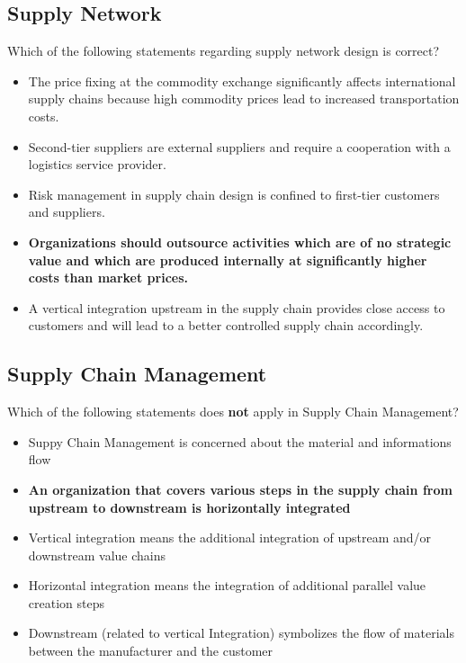 \subsection{Supply Network }
Which of the following statements regarding supply network design is correct?
\begin{itemize}
	\item The price fixing at the commodity exchange significantly affects international supply chains because high commodity prices lead to increased transportation costs. 
	\item Second-tier suppliers are external suppliers and require a cooperation with a logistics service provider. 
	\item  Risk management in supply chain design is confined to first-tier customers and suppliers. 
	\item \textbf{Organizations should outsource activities which are of no strategic value and which are produced internally at significantly higher costs than market prices.  }
	\item  A vertical integration upstream in the supply chain provides close access to customers and will lead to a better controlled supply chain accordingly. 
\end{itemize}

\subsection{Supply Chain Management}
Which of the following statements does \textbf{not} apply in Supply Chain Management?
\begin{itemize}
\item Suppy Chain Management is concerned about the material and informations flow
\item \textbf{An organization that covers various steps in the supply chain from upstream to downstream is horizontally integrated}
\item Vertical integration means the additional integration of upstream and/or downstream value chains 
\item Horizontal integration means the integration of additional parallel value creation steps
\item Downstream (related to vertical Integration) symbolizes the flow of materials between the manufacturer and the customer
\end{itemize}

